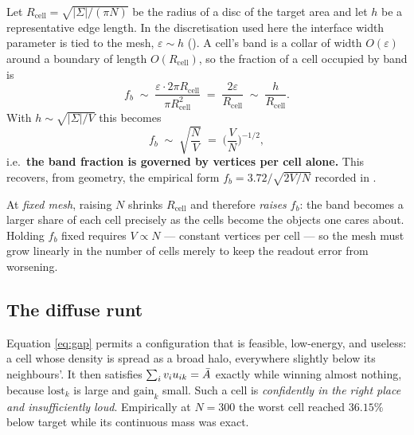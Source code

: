 \documentclass[11pt,a4paper]{article}
\begin{document}
Let $R_{\mathrm{cell}} = \sqrt{|\Sigma| / (\pi N)}$ be the radius of a disc of the
target area and let $h$ be a representative edge length. In the discretisation
used here the interface width parameter is tied to the mesh, $\varepsilon \sim h$
(). A cell's band is a collar
of width $O(\varepsilon)$ around a boundary of length $O(R_{\mathrm{cell}})$, so the
fraction of a cell occupied by band is
\begin{equation}
  f_b \;\sim\; \frac{\varepsilon \cdot 2\pi R_{\mathrm{cell}}}{\pi R_{\mathrm{cell}}^2}
     \;=\; \frac{2\varepsilon}{R_{\mathrm{cell}}}
     \;\sim\; \frac{h}{R_{\mathrm{cell}}} .
  \label{eq:bandfrac}
\end{equation}
With $h \sim \sqrt{|\Sigma|/V}$ this becomes
\begin{equation}
  f_b \;\sim\; \sqrt{\frac{N}{V}} \;=\; \Big(\frac{V}{N}\Big)^{-1/2},
  \label{eq:bandscaling}
\end{equation}
i.e.\ \textbf{the band fraction is governed by vertices per cell alone.} This
recovers, from geometry, the empirical form $f_b = 3.72 / \sqrt{2V/N}$ recorded in
.

\begin{remark}
At \emph{fixed mesh}, raising $N$ shrinks $R_{\mathrm{cell}}$ and therefore
\emph{raises} $f_b$: the band becomes a larger share of each cell precisely as the
cells become the objects one cares about. Holding $f_b$ fixed requires
$V \propto N$ --- constant vertices per cell --- so the mesh must grow linearly in
the number of cells merely to keep the readout error from worsening.
\end{remark}

\subsection{The diffuse runt}

Equation \eqref{eq:gap} permits a configuration that is feasible, low-energy, and
useless: a cell whose density is spread as a broad halo, everywhere slightly below
its neighbours'. It then satisfies $\sum_i v_i u_{ik} = \bar{A}$ exactly while
winning almost nothing, because $\mathrm{lost}_k$ is large and $\mathrm{gain}_k$ small. Such a
cell is \emph{confidently in the right place and insufficiently loud}. Empirically
at $N=300$ the worst cell reached $36.15\%$ below target while its continuous mass
was exact.
\end{document}
